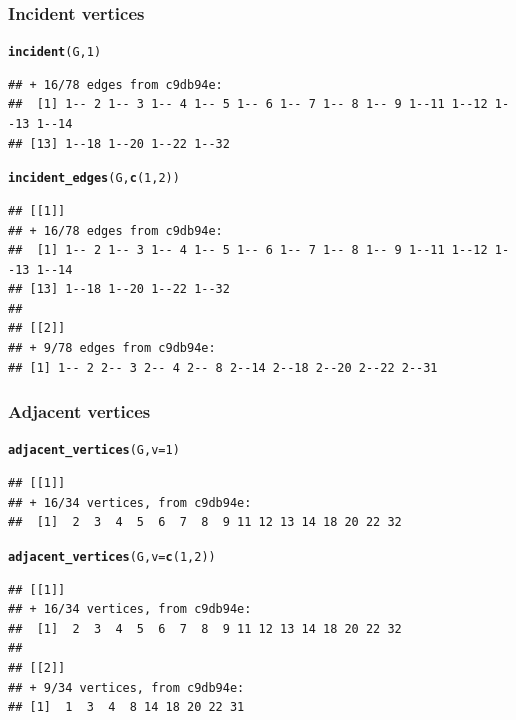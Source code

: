\documentclass[aspectratio=169]{beamer}\usepackage[]{graphicx}\usepackage[]{xcolor}
\makeatletter
\newcommand{\hlnum}[1]{\textcolor[rgb]{0.686,0.059,0.569}{#1}}%
\newcommand{\hldef}[1]{\textcolor[rgb]{0.345,0.345,0.345}{#1}}%
\newcommand{\hlkwc}[1]{\textcolor[rgb]{0.333,0.667,0.333}{#1}}%
\newcommand{\hlkwd}[1]{\textcolor[rgb]{0.737,0.353,0.396}{\textbf{#1}}}%
\newenvironment{kframe}{%
 \def\at@end@of@kframe{}%
 \ifinner\ifhmode%
  \def\at@end@of@kframe{\end{minipage}}%
  \begin{minipage}{\columnwidth}%
 \fi\fi%
 \def\FrameCommand##1{\hskip\@totalleftmargin \hskip-\fboxsep
 \colorbox{shadecolor}{##1}\hskip-\fboxsep
     \hskip-\linewidth \hskip-\@totalleftmargin \hskip\columnwidth}%
 \MakeFramed {\advance\hsize-\width
   \@totalleftmargin\z@ \linewidth\hsize
   \@setminipage}}%
 {\par\unskip\endMakeFramed%
 \at@end@of@kframe}
\newenvironment{knitrout}{}{} %
\makeatother
\begin{document}
\begin{frame}[fragile]\frametitle{Incident vertices}
\begin{knitrout}
\color{fgcolor}\begin{kframe}
\begin{alltt}
\hlkwd{incident}\hldef{(G,} \hlnum{1}\hldef{)}
\end{alltt}
\begin{verbatim}
## + 16/78 edges from c9db94e:
##  [1] 1-- 2 1-- 3 1-- 4 1-- 5 1-- 6 1-- 7 1-- 8 1-- 9 1--11 1--12 1--13 1--14
## [13] 1--18 1--20 1--22 1--32
\end{verbatim}
\begin{alltt}
\hlkwd{incident_edges}\hldef{(G,} \hlkwd{c}\hldef{(}\hlnum{1}\hldef{,} \hlnum{2}\hldef{))}
\end{alltt}
\begin{verbatim}
## [[1]]
## + 16/78 edges from c9db94e:
##  [1] 1-- 2 1-- 3 1-- 4 1-- 5 1-- 6 1-- 7 1-- 8 1-- 9 1--11 1--12 1--13 1--14
## [13] 1--18 1--20 1--22 1--32
## 
## [[2]]
## + 9/78 edges from c9db94e:
## [1] 1-- 2 2-- 3 2-- 4 2-- 8 2--14 2--18 2--20 2--22 2--31
\end{verbatim}
\end{kframe}
\end{knitrout}
\end{frame}

\begin{frame}[fragile]\frametitle{Adjacent vertices}
\begin{knitrout}
\color{fgcolor}\begin{kframe}
\begin{alltt}
\hlkwd{adjacent_vertices}\hldef{(G,} \hlkwc{v} \hldef{=} \hlnum{1}\hldef{)}
\end{alltt}
\begin{verbatim}
## [[1]]
## + 16/34 vertices, from c9db94e:
##  [1]  2  3  4  5  6  7  8  9 11 12 13 14 18 20 22 32
\end{verbatim}
\begin{alltt}
\hlkwd{adjacent_vertices}\hldef{(G,} \hlkwc{v} \hldef{=} \hlkwd{c}\hldef{(}\hlnum{1}\hldef{,} \hlnum{2}\hldef{))}
\end{alltt}
\begin{verbatim}
## [[1]]
## + 16/34 vertices, from c9db94e:
##  [1]  2  3  4  5  6  7  8  9 11 12 13 14 18 20 22 32
## 
## [[2]]
## + 9/34 vertices, from c9db94e:
## [1]  1  3  4  8 14 18 20 22 31
\end{verbatim}
\end{kframe}
\end{knitrout}
\end{frame}
\end{document}
